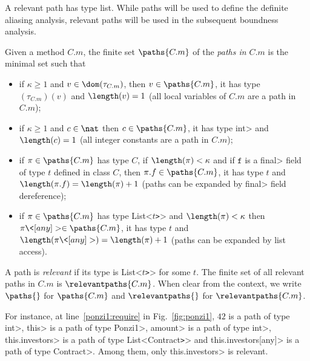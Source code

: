 A relevant path has type list. While paths will be used
to define the definite aliasing analysis, relevant paths will be used in the
subsequent boundness analysis.
%
\begin{definition}[Paths]\label{def:path}
  Given a method $C.m$, the finite set $\paths{C.m}$ of the
  \emph{paths in $C.m$} is the minimal set such that
  \begin{itemize}
  \item if $\kappa\ge 1$ and $v\in\dom(\tau_{C.m})$,
    then $v\in\paths{C.m}$, it has type $(\tau_{C.m})(v)$
    and $\length(v)=1$ (all local variables of $C.m$ are a path in $C.m$);
  \item if $\kappa\ge 1$ and $c\in\nat$ then $c\in\paths{C.m}$, it has type \<int>
    and $\length(c)=1$ (all integer constants are a path in $C.m$);
  \item if $\pi\in\paths{C.m}$ has type $C$, if $\length(\pi)<\kappa$
    and if $\mathtt{f}$ is a \<final> field of type $t$ defined in class $C$,
    then $\pi.f\in\paths{C.m}$, it has type $t$ and $\length(\pi.f)=\length(\pi)+1$
    (paths can be expanded by \<final> field dereference);
  \item if $\pi\in\paths{C.m}$ has type \<List<$t$\texttt{>}> and $\length(\pi)<\kappa$
    then $\pi\<[any]>\in\paths{C.m}$, it has type $t$ and $\length(\pi\<[any]>)=\length(\pi)+1$
    (paths can be expanded by list access).
  \end{itemize}
  A path is \emph{relevant} if its type is \<List<$t$\texttt{>}> for some $t$.
  The finite set of all relevant paths in $C.m$ is $\relevantpaths{C.m}$.
  When clear from the context, we write $\paths{}$ for $\paths{C.m}$ and
  $\relevantpaths{}$ for $\relevantpaths{C.m}$.
\end{definition}
%
For instance, at line~\ref{ponzi1:require} in Fig.~\ref{fig:ponzi1},
$42$ is a path of type \<int>, \<this> is a path of type \<Ponzi1>,
\<amount> is a path of type \<int>,
\<this.investors> is a path of type \<List<Contract\texttt{>}> and
\<this.investors[any]> is a path of type \<Contract>. Among them, only
\<this.investors> is relevant.

